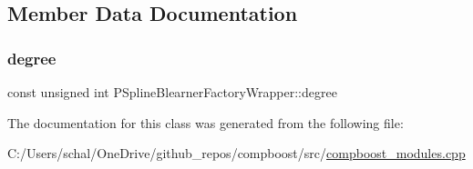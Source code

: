\subsection{Member Data Documentation}
\mbox{\label{class_p_spline_blearner_factory_wrapper_ac19835801a7c185a7a86749c7dcfaf18}} 
\subsubsection{\texorpdfstring{degree}{degree}}
{\footnotesize\ttfamily const unsigned int P\+Spline\+Blearner\+Factory\+Wrapper\+::degree\hspace{0.3cm}{\ttfamily [private]}}



The documentation for this class was generated from the following file\+:\begin{DoxyCompactItemize}
\item 
C\+:/\+Users/schal/\+One\+Drive/github\+\_\+repos/compboost/src/\mbox{\hyperlink{compboost__modules_8cpp}{compboost\+\_\+modules.\+cpp}}\end{DoxyCompactItemize}
